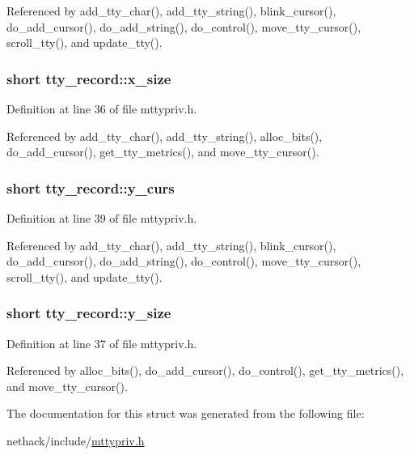 Referenced by add\+\_\+tty\+\_\+char(), add\+\_\+tty\+\_\+string(), blink\+\_\+cursor(), do\+\_\+add\+\_\+cursor(), do\+\_\+add\+\_\+string(), do\+\_\+control(), move\+\_\+tty\+\_\+cursor(), scroll\+\_\+tty(), and update\+\_\+tty().

\hypertarget{structtty__record_a39cb4eed8f87f26b1ab56d6d65d051e2}{
\subsubsection[{x\+\_\+size}]{\setlength{\rightskip}{0pt plus 5cm}short tty\+\_\+record\+::x\+\_\+size}}\label{structtty__record_a39cb4eed8f87f26b1ab56d6d65d051e2}


Definition at line 36 of file mttypriv.\+h.



Referenced by add\+\_\+tty\+\_\+char(), add\+\_\+tty\+\_\+string(), alloc\+\_\+bits(), do\+\_\+add\+\_\+cursor(), get\+\_\+tty\+\_\+metrics(), and move\+\_\+tty\+\_\+cursor().

\hypertarget{structtty__record_a76f07e1747d0f844f3a1f428b4677032}{
\subsubsection[{y\+\_\+curs}]{\setlength{\rightskip}{0pt plus 5cm}short tty\+\_\+record\+::y\+\_\+curs}}\label{structtty__record_a76f07e1747d0f844f3a1f428b4677032}


Definition at line 39 of file mttypriv.\+h.



Referenced by add\+\_\+tty\+\_\+char(), add\+\_\+tty\+\_\+string(), blink\+\_\+cursor(), do\+\_\+add\+\_\+cursor(), do\+\_\+add\+\_\+string(), do\+\_\+control(), move\+\_\+tty\+\_\+cursor(), scroll\+\_\+tty(), and update\+\_\+tty().

\hypertarget{structtty__record_aa44dcd9633186917f63209752768be6d}{
\subsubsection[{y\+\_\+size}]{\setlength{\rightskip}{0pt plus 5cm}short tty\+\_\+record\+::y\+\_\+size}}\label{structtty__record_aa44dcd9633186917f63209752768be6d}


Definition at line 37 of file mttypriv.\+h.



Referenced by alloc\+\_\+bits(), do\+\_\+add\+\_\+cursor(), do\+\_\+control(), get\+\_\+tty\+\_\+metrics(), and move\+\_\+tty\+\_\+cursor().



The documentation for this struct was generated from the following file\+:\begin{DoxyCompactItemize}
\item 
nethack/include/\hyperlink{mttypriv_8h}{mttypriv.\+h}\end{DoxyCompactItemize}
